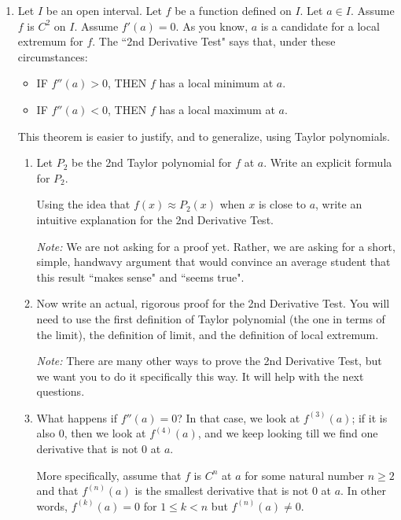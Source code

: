 \documentclass[12pt]{exam}
\begin{document}
\begin{enumerate}
\newpage

\item  Let $I$ be an open interval.    Let $f$ be a function defined on $I$.  Let $a \in I$.  Assume $f$ is $C^2$ on $I$.   Assume $f'(a) = 0$.   As you know, $a$ is a candidate for a local extremum for $f$.  The ``2nd Derivative Test" says that, under these circumstances:
	\begin{itemize}
		\item  IF $f''(a)>0$, THEN $f$ has a local minimum at $a$.
		\item  IF $f''(a)<0$, THEN $f$ has a local maximum at $a$.
	\end{itemize}
	 This theorem is easier to justify, and to generalize, using Taylor polynomials.
	\begin{enumerate}
		\item  \label{qu:int} Let $P_2$ be the 2nd Taylor polynomial for $f$ at $a$.  Write an explicit formula for $P_2$.
		
			Using the idea that $f(x) \approx P_2(x)$ when $x$ is close to $a$, write an intuitive explanation for the 2nd Derivative Test.  
			
			\emph{Note:}  We are not asking for a proof yet.  Rather, we are asking for a short, simple, handwavy argument that would convince an average student that this result ``makes sense" and ``seems true".
			
		\item  \label{qu:pf} Now write an actual, rigorous proof for the 2nd Derivative Test.  You will need to use the first definition of Taylor polynomial (the one in terms of the limit), the definition of limit, and the definition of local extremum.
				
			\emph{Note:}  There are many other ways to prove the 2nd Derivative Test, but we want you to do it specifically this way. It will help with the next questions.
	
		\item \label{qu:conj} What happens if $f''(a)=0$?     In that case, we look at $f^{(3)}(a)$;  if it is also $0$, then we look at $f^{(4)}(a)$, and we keep looking till we find one derivative that is not $0$ at $a$.   
		
		More specifically, assume that $f$ is $C^n$ at $a$ for some natural number $n \geq 2$ and that $f^{(n)}(a)$ is the smallest derivative  that is not $0$ at $a$.   In other words, $f^{(k)}(a) =0$ for $ 1 \leq k < n$ but $f^{(n)}(a) \neq 0$.
		

\end{enumerate}
\end{enumerate}
\end{document}
